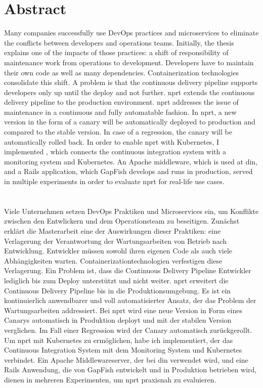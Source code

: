 \section*{Abstract}
Many companies successfully use DevOps practices and microservices to eliminate the
conflicts between developers and operations teams. Initially, the thesis explains one
of the impacts of those practices: a shift of responsibility of maintenance work from
operations to development. Developers have to maintain their own code as well as many
dependencies. Containerization technologies consolidate this shift. A problem is that the
continuous delivery pipeline supports developers only up until the deploy and not
further. \gls{nprt} extends the continuous delivery pipeline to the production
environment. \gls{nprt} addresses the issue of maintenance in a continuous and fully automatable
fashion. In \gls{nprt}, a new version in the form of a canary will be automatically deployed
to production and compared to the stable version. In case of a regression, the canary will
be automatically rolled back. In order to enable \gls{nprt} with Kubernetes, I implemented
\deployer, which connects the continuous integration system with a monitoring system and
Kubernetes. An Apache middleware, which is used at \gls{din}, and a Rails application,
which GapFish develops and runs in production, served in multiple experiments in order to
evaluate \gls{nprt} for real-life use cases.
\\\\\\
Viele Unternehmen setzen DevOps Praktiken und Microservices ein, um Konflikte zwischen den
Entwlickern und dem Operationsteam zu beseitigen. Zu\-nächst erklärt die Masterarbeit eine
der Auswirkungen dieser Praktiken: eine Verlagerung der Verantwortung der Wartungsarbeiten
von Betrieb nach Entwicklung. Entwickler müssen sowohl ihren eigenen Code als auch viele
Abhängigkeiten warten. Containerizationtechnologien verfestigen diese Verlagerung. Ein
Problem ist, dass die Continuous Delivery Pipeline Entwickler lediglich bis zum Deploy
unterstützt und nicht weiter. \gls{nprt} erweitert die Continuous Delivery Pipeline bis in
die Produktionsumgebung. Es ist ein kontinuierlich anwendbarer und voll automatisierter
Ansatz, der das Problem der Wartungsarbeiten addressiert. Bei \gls{nprt} wird eine neue
Version in Form eines Canarys automatisch in Produktion deployt und mit der stabilen
Version verglichen. Im Fall einer Regression wird der Canary automatisch zurückgerollt. Um
\gls{nprt} mit Kubernetes zu ermöglichen, habe ich \deployer implementiert, der das
Continuous Integration System mit dem Monitoring System und Kubernetes verbindet. Ein
Apache Middlewareserver, der bei \gls{din} verwendet wird, und eine Rails Anwendung, die
von GapFish entwickelt und in Produktion betrieben wird, dienen in mehreren Experimenten,
um \gls{nprt} praxisnah zu evaluieren.
